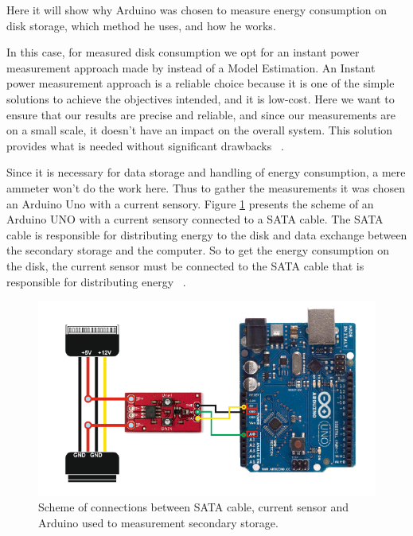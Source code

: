 \label{arduino}


Here it will show why Arduino was chosen to measure energy consumption on disk storage, which method he uses, and how he works.

In this case, for measured disk consumption we opt for an instant power measurement approach made by \citeauthor{portela2016} instead of a Model Estimation. An Instant power measurement approach is a reliable choice because it is one of the simple solutions to achieve the objectives intended, and it is low-cost. Here we want to ensure that our results are precise and reliable, and since our measurements are on a small scale, it doesn't have an impact on the overall system. This solution provides what is needed without significant drawbacks ~\cite{portela2016}.


Since it is necessary for data storage and handling of energy consumption, a mere ammeter won't do the work here. Thus to gather the measurements it was chosen an Arduino Uno with a current sensory. Figure \ref{fig:satacable} presents the scheme of an Arduino UNO with a current sensory connected to a SATA cable. The SATA cable is responsible for distributing energy to the disk and data exchange between the secondary storage and the computer.  So to get the energy consumption on the disk, the current sensor must be connected to the SATA cable that is responsible for distributing energy ~\cite{portela2016}.

\begin{figure}[H]
  \centering
  \includegraphics[width=0.8\columnwidth]{Chapters/images/arduino.png}  \caption{Scheme of connections between SATA cable, current sensor and Arduino used to measurement secondary storage.}
  \label{fig:satacable}
\end{figure}



